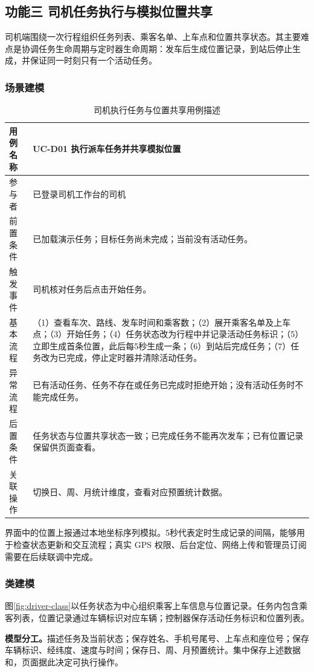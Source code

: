 \subsection{功能三 司机任务执行与模拟位置共享}
司机端围绕一次行程组织任务列表、乘客名单、上车点和位置共享状态。其主要难点是协调任务生命周期与定时器生命周期：发车后生成位置记录，到站后停止生成，并保证同一时刻只有一个活动任务。

\subsubsection{场景建模}
\begin{table}[H]\centering\small
\caption{司机执行任务与位置共享用例描述}
\begin{tabularx}{\linewidth}{|P{2cm}|Y|}\hline
用例名称 & UC-D01 执行派车任务并共享模拟位置\\\hline
参与者 & 已登录司机工作台的司机\\\hline
前置条件 & 已加载演示任务；目标任务尚未完成；当前没有活动任务。\\\hline
触发事件 & 司机核对任务后点击开始任务。\\\hline
基本流程 & （1）查看车次、路线、发车时间和乘客数；（2）展开乘客名单及上车点；（3）开始任务；（4）任务状态改为行程中并记录活动任务标识；（5）立即生成首条位置，此后每5秒生成一条；（6）到站后完成任务；（7）任务改为已完成，停止定时器并清除活动任务。\\\hline
异常流程 & 已有活动任务、任务不存在或任务已完成时拒绝开始；没有活动任务时不能完成任务。\\\hline
后置条件 & 任务状态与位置共享状态一致；已完成任务不能再次发车；已有位置记录保留供页面查看。\\\hline
关联操作 & 切换日、周、月统计维度，查看对应预置统计数据。\\\hline
\end{tabularx}\end{table}
界面中的位置上报通过本地坐标序列模拟。5秒代表定时生成记录的间隔，能够用于检查状态更新和交互流程；真实 GPS 权限、后台定位、网络上传和管理员订阅需要在后续联调中完成。

\subsubsection{类建模}
图\ref{fig:driver-class}以任务状态为中心组织乘客上车信息与位置记录。任务内包含乘客列表，位置记录通过车辆标识对应车辆；控制器保存活动任务标识和位置列表。

\noindent\textbf{模型分工。}描述任务及当前状态；保存姓名、手机号尾号、上车点和座位号；保存车辆标识、经纬度、速度与时间；保存日、周、月预置统计。集中保存上述数据和，页面据此决定可执行操作。

